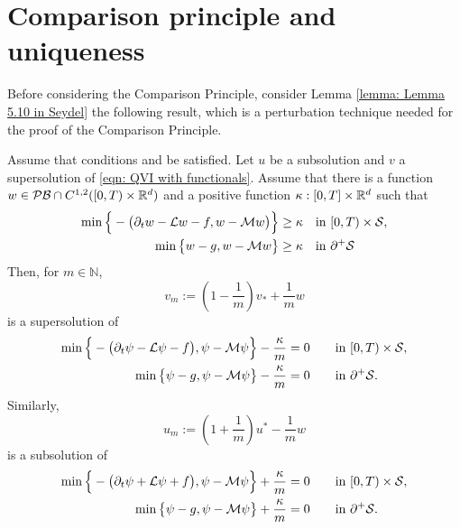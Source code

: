 \section{Comparison principle and uniqueness}
\label{section: Proof of the Uniqueness}
Before considering the Comparison Principle, consider Lemma \ref{lemma: Lemma 5.10 in Seydel} the following result, which is a perturbation technique needed for the proof of the Comparison Principle.
\begin{lemma}%
\label{lemma: Lemma 5.10 in Seydel}
    Assume that conditions  and  be satisfied. Let $u$ be a subsolution and $v$ a supersolution of \eqref{eqn: QVI with functionals}. Assume that there is a function $w \in \mathcal{PB} \cap C^{1,2}([0,T)\times \mathbb{R}^d)$ and a positive function $\kappa: [0,T] \times \mathbb{R}^d$ such that
    \begin{align*}
        \min \Big \{ - \big(\partial_t w - \mathcal{L} w - f, w - \mathcal{M} w \big) \Big\} \geq \kappa & \quad \text{in } [0,T) \times \mathcal{S}, \\
        \min \big\{ w - g, w - \mathcal{M} w \big\} \geq \kappa & \quad \text{in } \partial^+ \mathcal{S}
    \end{align*}
    Then, for $m \in \mathbb N$, 
    \begin{equation*}
        v_m := \left( 1 - \frac{1}{m} \right) v_* + \frac{1}{m} w
    \end{equation*}
    is a supersolution of 
    \begin{equation}
        \begin{aligned}
            \min \Big\{ -\big(\partial_t \psi - \mathcal{L} \psi - f \big), \psi - \mathcal{M} \psi \Big\} - \frac{\kappa}{m} &= 0 && \quad \text{in } [0,T) \times \mathcal{S},\\
            \min \big\{ \psi - g, \psi - \mathcal{M} \psi \big\} - \frac{\kappa}{m} &= 0 && \quad \text{in } \partial^+ \mathcal{S}.
        \end{aligned}
        \label{eqn: (43) in Seydel}
    \end{equation}
    Similarly, 
    \begin{equation*}
        u_m := \left( 1 + \frac{1}{m} \right) u^* - \frac{1}{m} w
    \end{equation*}
    is a subsolution of 
    \begin{equation}
        \begin{aligned}
            \min \Big\{ -\big(\partial_t \psi + \mathcal{L} \psi + f \big), \psi - \mathcal{M} \psi \Big\} + \frac{\kappa}{m} &= 0 && \quad \text{in } [0,T) \times \mathcal{S}, \\
            \min \big\{ \psi - g, \psi - \mathcal{M} \psi \big\} + \frac{\kappa}{m} &= 0 && \quad \text{in } \partial^+ \mathcal{S}.
        \end{aligned}
        \label{eqn: (43*) in Seydel}
    \end{equation}
\end{lemma}
